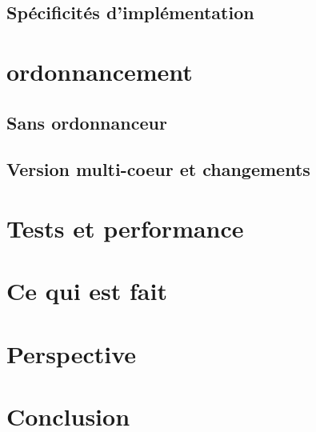 \documentclass{article}
\begin{document}
	\subsection{Spécificités d'implémentation}

	\section{ordonnancement}

	\subsection{Sans ordonnanceur}

	\subsection{Version multi-coeur et changements}

	\section{Tests et performance}

	\section{Ce qui est fait}

	\section{Perspective}

	\section{Conclusion}
\end{document}

